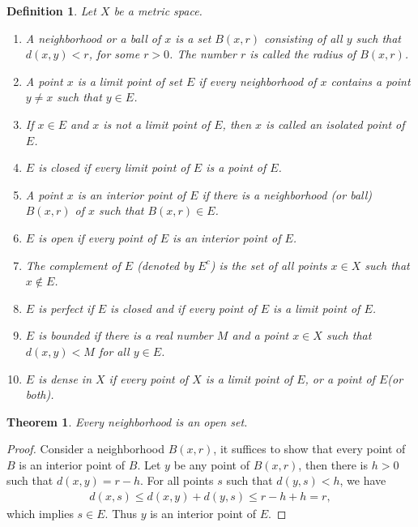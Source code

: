 \documentclass[11pt]{book}
\newtheorem{definition}{Definition}[chapter]
\newtheorem{theorem}{Theorem}[chapter]
\theoremstyle{definition}
\numberwithin{equation}{chapter}
\begin{document}
\medskip

\begin{definition}
Let $X$ be a metric space. 
\begin{enumerate}[label=(\alph*)]
    \item A neighborhood or a ball of $x$ is a set $B(x,r)$ consisting of all $y$ such that $d(x,y) < r$, for some $r > 0$. The number $r$ is called the radius of $B(x,r)$.
    
    \item A point $x$ is a limit point of set $E$ if every neighborhood of $x$ contains a point $y \neq x$ such that $y \in E$.
    
    \item If $x\in E$ and $x$ is not a limit point of $E$, then $x$ is called an isolated point of $E$.
    
    \item $E$ is closed if every limit point of $E$ is a point of $E$.
    
    \item A point $x$ is an interior point of $E$ if there is a neighborhood (or ball) $B(x,r)$ of $x$ such that $B(x,r) \in E$.
    
    \item $E$ is open if every point of $E$ is an interior point of $E$.
    
    \item The complement of $E$ (denoted by $E^c$) is the set of all points $x\in X$ such that $x\notin E$.
    
    \item $E$ is perfect if $E$ is closed and if every point of $E$ is a limit point of $E$.
    
    \item $E$ is bounded if there is a real number $M$ and a point $x\in X$ such that $d(x, y) < M$ for all $y\in E$.
    
    \item $E$ is dense in $X$ if every point of $X$ is a limit point of $E$, or a point of $E$(or both).
\end{enumerate}
\end{definition}

\medskip

\begin{theorem}
Every neighborhood is an open set.
\end{theorem}
\begin{proof}
Consider a neighborhood $B(x,r)$, it suffices to show that every point of $B$ is an interior point of $B$. Let $y$ be any point of $B(x,r)$, then there is $h > 0$ such that $d(x,y) = r - h$. For all points $s$ such that $d(y,s) < h$, we have
\begin{align*}
    d(x,s) \leq d(x,y) + d(y,s) \leq r - h + h = r,
\end{align*}
which implies $s \in E$. Thus $y$ is an interior point of $E$.
\end{proof}
\end{document}
